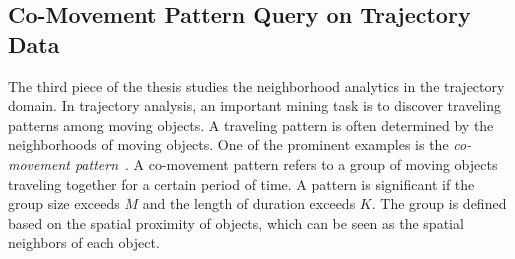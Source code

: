 \subsection{Co-Movement Pattern Query on Trajectory Data}
The third piece of the thesis studies the neighborhood
analytics in the trajectory domain. 
In trajectory analysis, an important
mining task is to discover traveling patterns among moving objects. 
A traveling pattern is often determined by the neighborhoods of moving objects. One of the prominent examples is the \emph{co-movement pattern}~\cite{li2013effective,zheng2015trajectory}.
A co-movement pattern refers to a group of moving objects traveling together for a certain period of time. A pattern is significant if the group size exceeds $M$ and the length of duration exceeds $K$. 
The group is defined based on the spatial proximity of objects, which 
can be seen as the spatial neighbors of each object.


